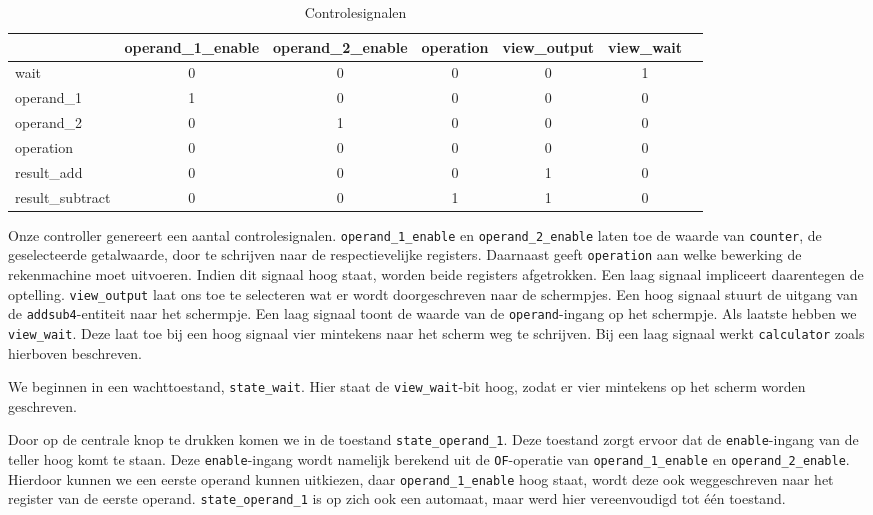 \documentclass[titlepage]{article}
\begin{document}
\begin{table}[h!]
    \centering

    \begin{tabular}{l|cccccc}
                            & operand\_1\_enable & operand\_2\_enable & operation & view\_output & view\_wait \\
        \hline
        wait                & 0                  & 0                  & 0         & 0            & 1 \\
        operand\_1          & 1                  & 0                  & 0         & 0            & 0 \\
        operand\_2          & 0                  & 1                  & 0         & 0            & 0 \\
        operation           & 0                  & 0                  & 0         & 0            & 0 \\
        result\_add         & 0                  & 0                  & 0         & 1            & 0 \\
        result\_subtract    & 0                  & 0                  & 1         & 1            & 0 \\
    \end{tabular}
    \caption{Controlesignalen}
    \label{tab:controlesignalen}
\end{table}

Onze controller genereert een aantal controlesignalen.
\texttt{operand\_1\_enable} en \texttt{operand\_2\_enable} laten toe de waarde van \texttt{counter}, de geselecteerde getalwaarde, door te schrijven naar de respectievelijke registers.
Daarnaast geeft \texttt{operation} aan welke bewerking de rekenmachine moet uitvoeren.
Indien dit signaal hoog staat, worden beide registers afgetrokken.
Een laag signaal impliceert daarentegen de optelling.
\texttt{view\_output} laat ons toe te selecteren wat er wordt doorgeschreven naar de schermpjes.
Een hoog signaal stuurt de uitgang van de \texttt{addsub4}-entiteit naar het schermpje.
Een laag signaal toont de waarde van de \texttt{operand}-ingang op het schermpje.
Als laatste hebben we \texttt{view\_wait}.
Deze laat toe bij een hoog signaal vier mintekens naar het scherm weg te schrijven.
Bij een laag signaal werkt \texttt{calculator} zoals hierboven beschreven.

We beginnen in een wachttoestand, \texttt{state\_wait}.
Hier staat de \texttt{view\_wait}-bit hoog, zodat er vier mintekens op het scherm worden geschreven.

Door op de centrale knop te drukken komen we in de toestand \texttt{state\_operand\_1}.
Deze toestand zorgt ervoor dat de \texttt{enable}-ingang van de teller hoog komt te staan.
Deze \texttt{enable}-ingang wordt namelijk berekend uit de \texttt{OF}-operatie van \texttt{operand\_1\_enable} en \texttt{operand\_2\_enable}.
Hierdoor kunnen we een eerste operand kunnen uitkiezen, daar \texttt{operand\_1\_enable} hoog staat, wordt deze ook weggeschreven naar het register van de eerste operand.
\texttt{state\_operand\_1} is op zich ook een automaat, maar werd hier vereenvoudigd tot één toestand.
\end{document}
